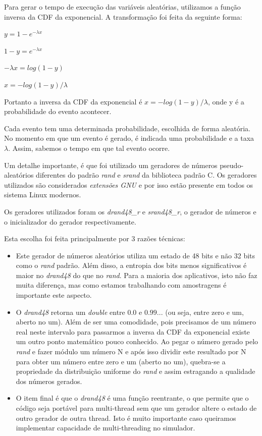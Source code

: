 \documentclass[a4paper,10pt]{article}
\begin{document}
	Para gerar o tempo de execução das variáveis aleatórias, utilizamos a função inversa da CDF da exponencial. A transformação foi feita da seguinte forma:

    $ y = 1 - e^{-\lambda x} $

    $ 1 - y  = e^{-\lambda x} $

    $ -\lambda x = log (1 - y) $

    $ x = -{log(1 - y)} / \lambda $

	Portanto a inversa da CDF da exponencial é $ x = -{log(1 - y)} / \lambda $, onde y é a probabilidade do evento acontecer.

	Cada evento tem uma determinada probabilidade, escolhida de forma aleatória. No momento em que um evento é gerado, é indicada uma probabilidade e a taxa $\lambda$. Assim, sabemos o tempo em que tal evento ocorre.

	Um detalhe importante, é que foi utilizado um geradores de números pseudo-aleatórios diferentes do padrão \emph{rand} e \emph{srand} da biblioteca padrão C. Os geradores utilizados são considerados \emph{extensões GNU} e por isso estão presente em todos os sistema Linux modernos.

	Os geradores utilizados foram os \emph{drand48\_r\(\)} e \emph{srand48\_r\(\)}, o gerador de números e o inicializador do gerador respectivamente.

	Esta escolha foi feita principalmente por 3 razões técnicas:
	\begin{itemize}
	\item Este gerador de números aleatórios utiliza um estado de 48 bits e não 32 bits como o \emph{rand} padrão. Além disso, a entropia dos bits menos significativos é maior no \emph{drand48} do que no \emph{rand}. Para a maioria dos aplicativos, isto não faz muita diferença, mas como estamos trabalhando com amostragens é importante este aspecto.

	\item O \emph{drand48} retorna um \emph{double} entre $0.0$ e $0.99...$ (ou seja, entre zero e um, aberto no um). Além de ser uma comodidade, pois precisamos de um número real neste intervalo para passarmos a inversa da CDF da exponencial existe um outro ponto matemático pouco conhecido. Ao pegar o número gerado pelo \emph{rand} e fazer módulo um número N e após isso dividir este resultado por N para obter um número entre zero e um (aberto no um), quebra-se a propriedade da distribuição uniforme do \emph{rand} e assim estragando a qualidade dos números gerados.

	\item O item final é que o \emph{drand48} é uma função reentrante, o que permite que o código seja portável para multi-thread sem que um gerador altere o estado de outro gerador de outra thread. Isto é muito importante caso queiramos implementar capacidade de multi-threading no simulador.
	\end{itemize}
\end{document}
